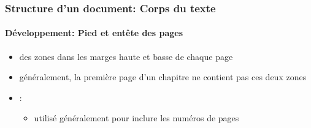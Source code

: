 \documentclass[xcolor=table]{beamer}
\begin{document}
\begin{frame}
\frametitle{Structure d'un document: Corps du texte}
\framesubtitle{Développement: Pied et entête des pages}

\begin{minipage}{0.60\textwidth}
	\begin{itemize}
		\item des zones dans les marges haute et basse de chaque page 
		\item généralement, la première page d'un chapitre ne contient pas ces deux zones 
		\item {}: 
		\begin{itemize}
			\item utilisé généralement pour inclure les numéros de pages
		\end{itemize}
		

\end{itemize}
\end{minipage}
\end{frame}
\end{document}
